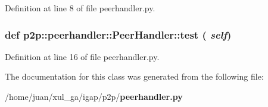 Definition at line 8 of file peerhandler.py.
\subsubsection{\setlength{\rightskip}{0pt plus 5cm}def p2p::peerhandler::PeerHandler::test ( {\em self})}\label{classp2p_1_1peerhandler_1_1PeerHandler_1b562ce5ede1c896ddcec798d54a870f}




Definition at line 16 of file peerhandler.py.

The documentation for this class was generated from the following file:\begin{CompactItemize}
\item 
/home/juan/xul\_\-ga/igap/p2p/{\bf peerhandler.py}\end{CompactItemize}
